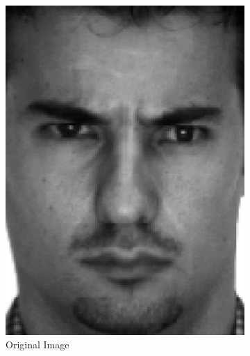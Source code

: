 \documentclass[review]{elsarticle}
\begin{document}
\begin{figure}[H]
 \hspace*{\fill}
\centering
\begin{subfigure}[b]{0.18\textwidth}
\centering
	\includegraphics[width=\linewidth]{Fig_5a}
		\caption{Original Image}
	\label{fig:orig_image_ex_3} \hfill
\end{subfigure}
\begin{subfigure}[b]{0.18\textwidth} 
\centering

\end{subfigure}
\end{figure}
\end{document}
